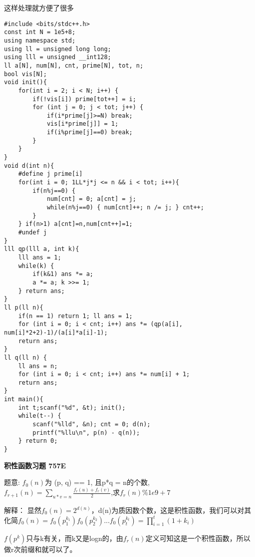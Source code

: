  这样处理就方便了很多


\begin{lstlisting}
#include <bits/stdc++.h>
const int N = 1e5+8;
using namespace std;
using ll = unsigned long long;
using lll = unsigned __int128;
ll a[N], num[N], cnt, prime[N], tot, n;
bool vis[N];
void init(){ 
    for(int i = 2; i < N; i++) {
        if(!vis[i]) prime[tot++] = i;
        for (int j = 0; j < tot; j++) {
            if(i*prime[j]>=N) break;
            vis[i*prime[j]] = 1;
            if(i%prime[j]==0) break;
        }
    }
}
void d(int n){
    #define j prime[i]
    for(int i = 0; 1LL*j*j <= n && i < tot; i++){
        if(n%j==0) {
            num[cnt] = 0; a[cnt] = j;
            while(n%j==0) { num[cnt]++; n /= j; } cnt++;
        }
    } if(n>1) a[cnt]=n,num[cnt++]=1;
    #undef j
}
lll qp(lll a, int k){
    lll ans = 1;
    while(k) {
        if(k&1) ans *= a;
        a *= a; k >>= 1;
    } return ans;
}
ll p(ll n){
    if(n == 1) return 1; ll ans = 1;
    for (int i = 0; i < cnt; i++) ans *= (qp(a[i], num[i]*2+2)-1)/(a[i]*a[i]-1);
    return ans;
}
ll q(ll n) {
    ll ans = n;
    for (int i = 0; i < cnt; i++) ans *= num[i] + 1;
    return ans;
}
int main(){
    int t;scanf("%d", &t); init();
    while(t--) {
        scanf("%lld", &n); cnt = 0; d(n);
        printf("%llu\n", p(n) - q(n));
    } return 0;
}

\end{lstlisting}

{\bfseries 积性函数习题 757E}

题意: $f_0 (n)$为 (p, q) == 1, 且p*q = n的个数, $f_{r+1}(n) = \sum_{u * v=n} \frac{f_{r}(u) + f_{r}(v)}{2} $,求$f_r(n) \%1e9+7$

解释： 显然$f_0(n) = 2^{d(n)}$，d(n)为质因数个数，这是积性函数，我们可以对其化简$f_0(n) = f_0(p_1^{k_1})f_0(p_2^{k_2})...f_0(p_t^{k_t}) = \prod_{i=1}^t(1+k_i)$

$f(p^k)$只与k有关，而k又是logn的，由$f_r(n)$定义可知这是一个积性函数，所以做r次前缀和就可以了。


